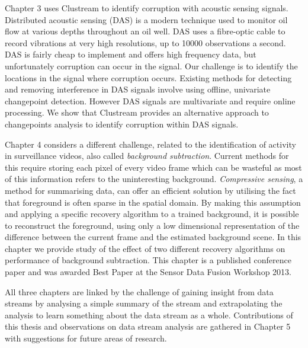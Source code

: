Chapter 3 uses Clustream to identify corruption with acoustic sensing signals.  Distributed acoustic sensing (DAS) is a modern technique used to monitor oil flow at various depths throughout an oil  well. DAS uses a fibre-optic cable to record vibrations at very high resolutions, up to 10000 observations a second.  DAS is fairly cheap to implement and offers high frequency data, but unfortunately corruption can occur in the signal.  Our challenge is to identify the locations in the signal where corruption occurs. Existing methods for detecting and removing interference in DAS signals involve using offline, univariate changepoint detection. However DAS signals are multivariate and require online processing. We show that Clustream  provides an alternative approach to changepoints analysis to identify corruption within DAS signals.

Chapter 4 considers a different challenge, related to the identification of activity in surveillance videos, also called \textit{background subtraction}. Current methods for this require storing each pixel of every video frame which can be wasteful as most of this information refers to the uninteresting background. \textit{Compressive sensing}, a method for summarising data, can offer an efficient solution by utilising the fact that foreground is often sparse in the spatial domain. By making this assumption and applying a specific recovery algorithm to a trained background, it is possible to reconstruct the foreground, using only a low dimensional representation of the difference between the current frame and the estimated background scene. In this chapter we provide study  of the effect of two different recovery algorithms on performance of background subtraction. This chapter is a published conference paper \citep{Davies2013} and was awarded Best Paper at the Sensor Data Fusion Workshop 2013. 

All three chapters are linked by the challenge of gaining insight from data streams by analysing a simple summary of the stream and extrapolating the analysis to learn something about the data stream as a whole. Contributions of this thesis and observations on data stream analysis are gathered in Chapter 5  with suggestions for future areas of research.


